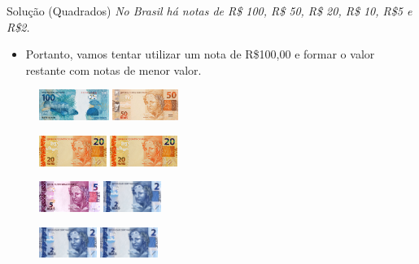 \documentclass{beamer}
\begin{document}
\begin{frame}{Solução (Quadrados)}
\textit{No Brasil há notas de R\$ 100, R\$ 50, R\$ 20, R\$ 10, R\$5 e R\$2.}
\begin{itemize}
    \item Portanto, vamos tentar utilizar um nota de R\$100,00 e formar o valor restante com notas de menor valor.
\end{itemize}

\begin{figure}[tb]
\begin{center}
	\includegraphics[height=1cm]{100.jpg} \pause \quad
	\includegraphics[height=1cm]{50.jpg}
\end{center}
\end{figure}
\pause 
\begin{figure}[tb]
\begin{center}
	\includegraphics[height=1cm]{20.jpg}  \pause \quad
	\includegraphics[height=1cm]{20.jpg}
\end{center}
\end{figure}
\pause 
\begin{figure}[tb]
\begin{center}
	\includegraphics[height=1cm]{5.jpg}  \pause \quad 
	\includegraphics[height=1cm]{2.jpg} \quad
\end{center}
\end{figure}
 \pause 
\begin{figure}[tb]
\begin{center}
	\includegraphics[height=1cm]{2.jpg} \quad
	\includegraphics[height=1cm]{2.jpg}
\end{center}
\end{figure}

\end{frame}
\end{document}
